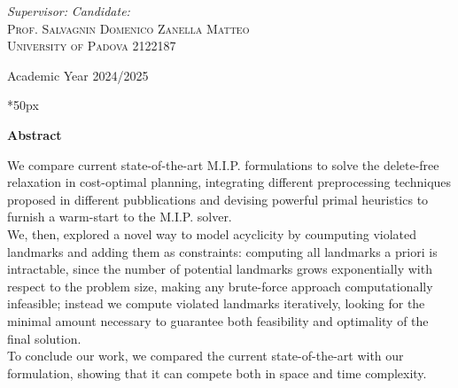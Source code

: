 \documentclass[a4paper,twoside,12pt]{report}
\begin{document}
\begin{titlepage}
\begin{center}
\vfill

\textit{\large Supervisor:} \hfill \textit{\large Candidate:}\\
\textsc{\large Prof. Salvagnin Domenico} \hfill \textsc{Zanella Matteo}\\
\textsc{University of Padova} \hfill \textsc{2122187}\\

\vfill

Academic Year 2024/2025

\vfill


\end{center}
\end{titlepage}

\thispagestyle{empty}
\clearpage{\pagestyle{plain}\cleardoublepage}
    
\clearpage\null\newpage

\newcommand\summaryname{Abstract}
\newenvironment{Abstract} {
    \begin{center}%
    \bfseries{\summaryname} \end{center}
}

\vspace*{50px}

\begin{Abstract}
    \begin{center}
        We compare current state-of-the-art M.I.P. formulations to solve the delete-free relaxation in cost-optimal planning, integrating different preprocessing techniques proposed in different pubblications and devising powerful primal heuristics to furnish a warm-start to the M.I.P. solver.\\
        We, then, explored a novel way to model acyclicity by coumputing violated landmarks and adding them as constraints: computing all landmarks a priori is intractable, since the number of potential landmarks grows exponentially with respect to the problem size, making any brute-force approach computationally infeasible; instead we compute violated landmarks iteratively, looking for the minimal amount necessary to guarantee both feasibility and optimality of the final solution.\\
        To conclude our work, we compared the current state-of-the-art with our formulation, showing that it can compete both in space and time complexity.
    \end{center}
\end{Abstract}
\end{document}
